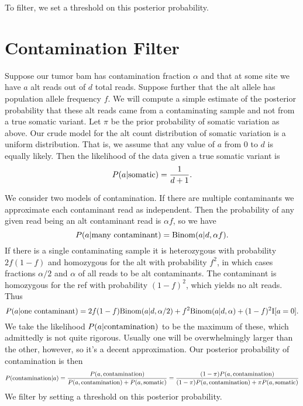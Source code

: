 \documentclass[nofootinbib,amssymb,amsmath]{revtex4}
\begin{document}
To filter, we set a threshold on this posterior probability.

\section{Contamination Filter}\label{contamination-filter}
Suppose our tumor bam has contamination fraction $\alpha$ and that at some site we have $a$ alt reads out of $d$ total reads.  Suppose further that the alt allele has population allele frequency $f$.  We will compute a simple estimate of the posterior probability that these alt reads came from a contaminating sample and not from a true somatic variant.  Let $\pi$ be the prior probability of somatic variation as above.  Our crude model for the alt count distribution of somatic variation is a uniform distribution.  That is, we assume that any value of $a$ from $0$ to $d$ is equally likely.  Then the likelihood of the data given a true somatic variant is
\begin{equation}
P(a | {\rm somatic})  = \frac{1}{d + 1}.
\end{equation}

We consider two models of contamination.  If there are multiple contaminants we approximate each contaminant read as independent.  Then the probability of any given read being an alt contaminant read is $\alpha f$, so we have
\begin{equation}
P(a | {\rm many~contaminant}) = {\rm Binom}(a | d, \alpha f).
\end{equation}
If there is a single contaminating sample it is heterozygous with probability $2f(1-f)$ and homozygous for the alt with probability $f^2$, in which cases fractions $\alpha/2$ and $\alpha$ of all reads to be alt contaminants.  The contaminant is homozygous for the ref with probability $(1-f)^2$, which yields no alt reads. Thus
\begin{equation}
P(a | {\rm one~contaminant}) = 2f(1-f) {\rm Binom}(a | d, \alpha /2) + f^2 {\rm Binom}(a | d, \alpha) + (1-f)^2 {\rm I}[a = 0].
\end{equation}
We take the likelihood $P(a | {\rm contamination})$ to be the maximum of these, which admittedly is not quite rigorous.  Usually one will be overwhelmingly larger than the other, however, so it's a decent approximation.  Our posterior probability of contamination is then
\begin{equation}
P({\rm contamination} | a) = \frac{  P(a, {\rm contamination}) } {P(a, {\rm contamination}) + P(a, {\rm somatic}) } = \frac{  (1-\pi)P(a, {\rm contamination}) } {(1-\pi)P(a, {\rm contamination}) + \pi P(a, {\rm somatic}) }
\end{equation}
We filter by setting a threshold on this posterior probability.
\end{document}
